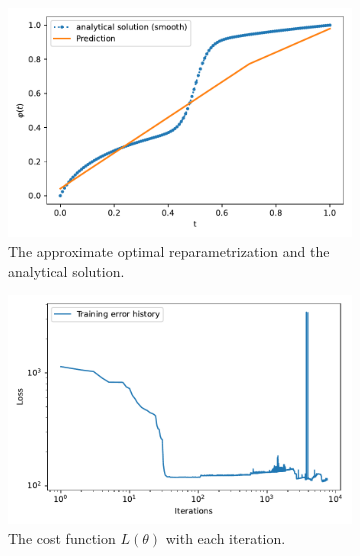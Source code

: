 \begin{figure}[t]\label{fig:curve_1_pc_pl_example}
    \begin{subfigure}[t]{0.5\textwidth}
        \centering
        \includegraphics[width=\linewidth]{figures/curve_1_pc/eks_2/plot_0_0.pdf}
        \caption{The approximate optimal reparametrization and the analytical solution.}
        \label{fig:curve_1_pc_solution}
    \end{subfigure}
    \begin{subfigure}[t]{0.5\textwidth}
        \centering
        \includegraphics[width=\linewidth]{figures/curve_1_pc/eks_2/history_plot_0.pdf}
        \caption{The cost function \(L(\theta)\) with each iteration.}
        \label{fig:curve_1_pc_history}
    \end{subfigure}
    \begin{subfigure}[t]{0.5\textwidth}
        \centering

\end{subfigure}
\end{figure}
